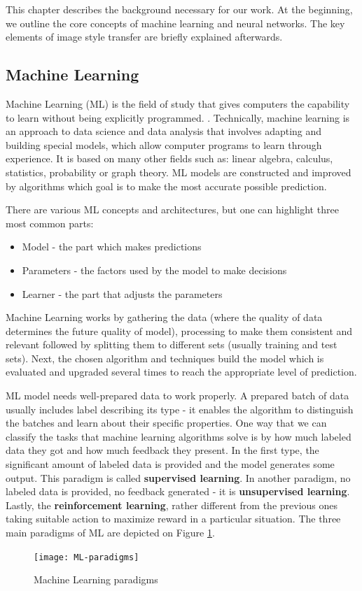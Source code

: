 \documentclass[../Main.tex]{subfiles}
\begin{document}
    This chapter describes the background necessary for our work. At the beginning, we outline the core concepts of machine learning and neural networks. The key elements of image style transfer are briefly explained afterwards.

\subsection{Machine Learning} 
    Machine Learning (ML) is the field of study that gives computers the capability to learn without being explicitly programmed. . Technically, machine learning is an approach to data science and data analysis that involves adapting and building special models, which allow computer programs to learn through experience. It is based on many other fields such as: linear algebra, calculus, statistics, probability or graph theory. ML models are constructed and improved by algorithms which goal is to make the most accurate possible prediction.
    
    There are various ML concepts and architectures, but one can highlight three most common parts:
    \begin{itemize}
        \item Model - the part which makes predictions
        \item Parameters - the factors used by the model to make decisions
        \item Learner - the part that adjusts the parameters
    \end{itemize}
    Machine Learning works by gathering the data (where the quality of data determines the future quality of model), processing to make them consistent and relevant followed by splitting them to different sets (usually training and test sets). Next, the chosen algorithm and techniques build the model which is evaluated and upgraded several times to reach the appropriate level of prediction.
    
    ML model needs well-prepared data to work properly. A prepared batch of data usually includes  label describing its type - it enables the algorithm to distinguish the batches and learn about their specific properties. One way that we can classify the tasks that machine learning algorithms solve is by how much labeled data they got and how much feedback they present. In the first type, the significant amount of labeled data is provided and the model generates some output. This paradigm is called \textbf{supervised learning}. In another paradigm, no labeled data is provided, no feedback generated - it is  \textbf{unsupervised learning}. Lastly, the \textbf{reinforcement learning}, rather different from the previous ones taking suitable action to maximize reward in a particular situation. The three main paradigms of ML are depicted on Figure \ref{fig:ML-paradigms}. \\
    \begin{figure}[h]
        \centering
        \texttt{[image: ML-paradigms]}
        \caption{Machine Learning paradigms}
        \label{fig:ML-paradigms}
    \end{figure}
\end{document}
